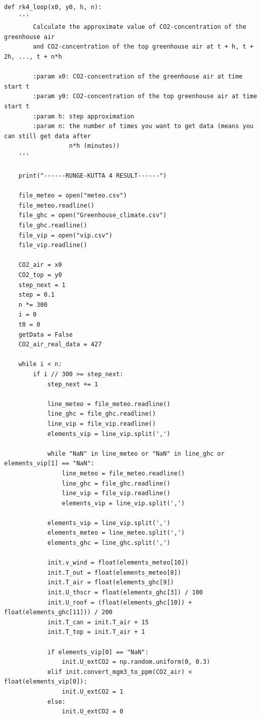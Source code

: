 \documentclass[a4paper]{article}
\begin{document}
\begin{verbatim}
def rk4_loop(x0, y0, h, n):
    '''
        Calculate the approximate value of CO2-concentration of the greenhouse air
        and CO2-concentration of the top greenhouse air at t + h, t + 2h, ..., t + n*h

        :param x0: CO2-concentration of the greenhouse air at time start t
        :param y0: CO2-concentration of the top greenhouse air at time start t
        :param h: step approximation
        :param n: the number of times you want to get data (means you can still get data after
                  n*h (minutes))
    '''

    print("------RUNGE-KUTTA 4 RESULT------")

    file_meteo = open("meteo.csv")
    file_meteo.readline()
    file_ghc = open("Greenhouse_climate.csv")
    file_ghc.readline()
    file_vip = open("vip.csv")
    file_vip.readline()

    CO2_air = x0
    CO2_top = y0
    step_next = 1
    step = 0.1
    n *= 300
    i = 0
    t0 = 0
    getData = False
    CO2_air_real_data = 427

    while i < n:
        if i // 300 >= step_next:
            step_next += 1

            line_meteo = file_meteo.readline()
            line_ghc = file_ghc.readline()
            line_vip = file_vip.readline()
            elements_vip = line_vip.split(',')

            while "NaN" in line_meteo or "NaN" in line_ghc or elements_vip[1] == "NaN":
                line_meteo = file_meteo.readline()
                line_ghc = file_ghc.readline()
                line_vip = file_vip.readline()
                elements_vip = line_vip.split(',')

            elements_vip = line_vip.split(',')
            elements_meteo = line_meteo.split(',')
            elements_ghc = line_ghc.split(',')

            init.v_wind = float(elements_meteo[10])
            init.T_out = float(elements_meteo[8])
            init.T_air = float(elements_ghc[9])
            init.U_thscr = float(elements_ghc[3]) / 100
            init.U_roof = (float(elements_ghc[10]) + float(elements_ghc[11])) / 200
            init.T_can = init.T_air + 15
            init.T_top = init.T_air + 1

            if elements_vip[0] == "NaN":
                init.U_extCO2 = np.random.uniform(0, 0.3)
            elif init.convert_mgm3_to_ppm(CO2_air) < float(elements_vip[0]):
                init.U_extCO2 = 1
            else:
                init.U_extCO2 = 0


\end{verbatim}
\end{document}
